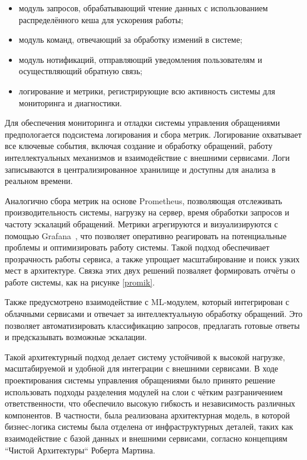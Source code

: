 \begin{itemize}
    \item модуль запросов, обрабатывающий чтение данных с использованием распределённого кеша для ускорения работы;
    \item модуль команд, отвечающий за обработку измений в системе;
    \item модуль нотификаций, отправляющий уведомления пользователям и осуществляющий обратную связь;
    \item логирование и метрики, регистрирующие всю активность системы для мониторинга и диагностики.
\end{itemize}

Для обеспечения мониторинга и отладки системы управления обращениями предпологается подсистема логирования и сбора метрик. Логирование охватывает все ключевые события, включая создание и обработку обращений, работу интеллектуальных механизмов и взаимодействие с внешними сервисами. Логи записываются в централизированное хранилище и доступны для анализа в реальном времени.


Аналогично сбора метрик на основе Prometheus\cite{promic}, позволяющая отслеживать производительность системы, нагрузку на сервер, время обработки запросов и частоту эскалаций обращений. Метрики агрегируются и визуализируются с помощью Grafana~\cite{Grafana}, что позволяет оперативно реагировать на потенциальные проблемы и оптимизировать работу системы. Такой подход обеспечивает прозрачность работы сервиса, а также упрощает масштабирование и поиск узких мест в архитектуре. Связка этих двух решений позваляет формировать отчёты о работе системы, как на рисунке \ref{promik}.

Также предусмотрено взаимодействие с ML-модулем, который интегрирован с облачными сервисами и отвечает за интеллектуальную обработку обращений. Это позволяет автоматизировать классификацию запросов, предлагать готовые ответы и предсказывать возможные эскалации.

Такой архитектурный подход делает систему устойчивой к высокой нагрузке, масштабируемой и удобной для интеграции с внешними сервисами. В ходе проектирования системы управления обращениями было принято решение использовать подходы разделения модулей на слои с чётким разграничением ответственности, что обеспечило высокую гибкость и независимость различных компонентов. В частности, была реализована архитектурная модель, в которой бизнес-логика системы была отделена от инфраструктурных деталей, таких как взаимодействие с базой данных и внешними сервисами, согласно концепциям ``Чистой Архитектуры``\cite{Martin2017} Роберта Мартина.

